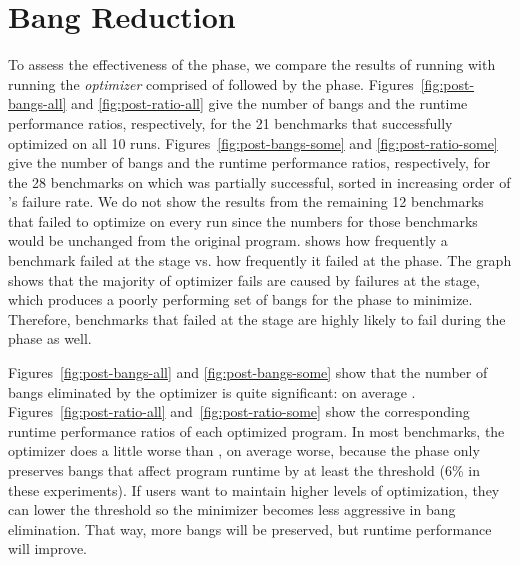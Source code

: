 
\section{\Postopt{} Bang Reduction}

To assess the effectiveness of the \postopt{} phase,
we compare the results of running \Ao{} with running
the \textit{\Postopt{} optimizer} comprised of \Ao{} followed by
the \postopt{} phase.
Figures~\ref{fig:post-bangs-all} and \ref{fig:post-ratio-all}
give the number of bangs and the runtime performance ratios,
respectively, for the 21 benchmarks that \At{} successfully optimized on all 10 runs.
Figures~\ref{fig:post-bangs-some} and \ref{fig:post-ratio-some}
give the number of bangs and the runtime performance ratios, respectively,
for the 28 benchmarks on which \At{} was partially successful,
sorted in increasing order of \At{}'s failure rate.
We do not show the results from the remaining 12 benchmarks that \At{}
failed to optimize on every run since the numbers for those benchmarks
would be unchanged from the original program.   shows how
frequently a benchmark failed at the \Ao{} stage vs. how frequently it
failed at the \postopt{} phase. The graph shows that the majority of \Postopt{} optimizer fails are
caused by failures at the \Ao{} stage, which produces a poorly
performing set of bangs for the \postopt{} phase to
minimize. Therefore, benchmarks that failed at the \Ao{} stage are
highly likely to fail during  the \postopt{} phase as well.


Figures~\ref{fig:post-bangs-all} and \ref{fig:post-bangs-some} show
that the number of bangs eliminated by the \Postopt{} optimizer is quite
significant: on average \postBangs{}. Figures~\ref{fig:post-ratio-all}
and~\ref{fig:post-ratio-some} show the corresponding runtime
performance ratios of each optimized program. In most benchmarks,
the \Postopt{} optimizer does
a little worse than \Ao{}, on average \postRatioWorse{} worse, because
the \postopt{} phase only preserves bangs that affect program
runtime by at least the \absim{} threshold (6\% in these experiments).
If users want to
maintain higher levels of optimization,
they can lower the \absim{} threshold so the minimizer becomes less
aggressive in bang elimination. That way, more bangs will be
preserved, but runtime performance will
improve.


